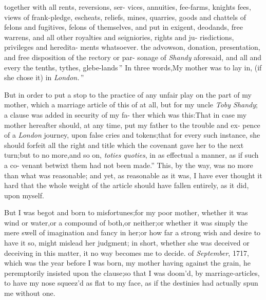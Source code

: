 \documentclass{article}
\begin{document}
\lqq together with all rents, reversions, ser-\break
\lqq vices, annuities, fee-farms, knights\break
\lqq fees, views of frank-pledge, escheats,\break
\lqq reliefs, mines, quarries, goods and\break
\lqq chattels of felons and fugitives, felons\break
\lqq of themselves, and put in exigent,\break
\lqq deodands, free warrens, and all other\break
\lqq royalties and seigniories, rights and ju-\break
\lqq risdictions, privileges and heredita-\break
\lqq ments whatsoever.\tsk {}\hbox{} the\break
\lqq advowson, donation, presentation, and\break
\lqq free disposition of the rectory or par-\break
\lqq sonage of \textit{Shandy} aforesaid, and all and\break
\lqq every the tenths, tythes, glebe-lands\,”\break
\tsh  In three words,\tsh \lqq My mother\break
\lqq was to lay in, (if she chose it) in\break
\lqq \textit{London.}\,”

But in order to put a stop to the practice of any unfair play on
the part of my mother, which a marriage article of this
of at all, but for my uncle \textit{Toby Shandy};\tsk\break 
a clause was added in security of my fa-\break
ther which was this:\tsk \lqq That in case my\break
\lqq mother hereafter should, at any time,\break
\lqq put my father to the trouble and ex-\break
\lqq pence of a \textit{London} journey, upon false\break
\lqq cries and tokens;\tsh  that for every\break
\lqq such instance, she should forfeit all the\break
\lqq right and title which the covenant gave\break
\lqq her to the next turn;\tsh  but to no\break
\lqq more,\tsk  and so on, \textit{toties quoties}, in as\break
\lqq effectual a manner, as if such a co-\break
\lqq venant betwixt them had not been\break
\lqq made.” \tsh This, by the way, was no\break
more than what was reasonable;\tsk
and yet, as reasonable as
it was, I have ever thought it hard that the whole weight of the
article should have fallen entirely, as\break
it did, upon myself.\\
\newpage

But I was begot and born to misfortunes;\tsk  for my poor
mother, whether it was wind or water,\tsk  or a compound of
both,\tsk  or neither;\tsk  or whether it was simply the mere
swell of imagination and fancy in her;\tsk  or how far a strong
wish and desire to have it so, might mislead her judgment;\tsk
in short, whether she was deceived or deceiving in this matter,
it no way becomes me to decide.\break {} of \textit{September}, 1717, which was
the year before I was born, my mother having\break
{} against the grain,\tsk
he peremptorily insisted upon the clause;\tsk so that I was
doom’d, by marriage-articles, to have my nose squeez’d as flat
to my face, as if the destinies had actually spun me without
one.
\end{document}
